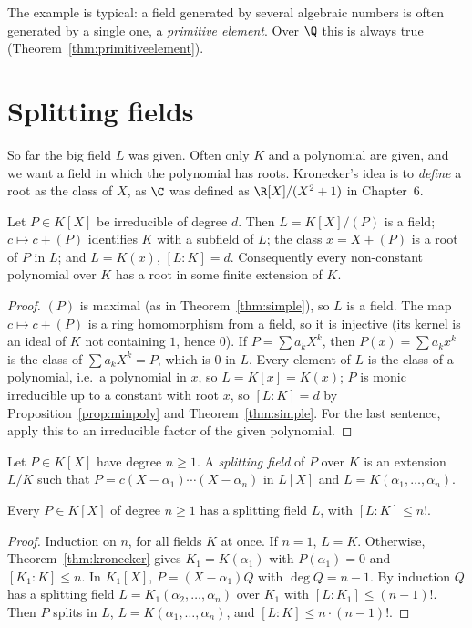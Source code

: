 The example is typical: a field generated by several algebraic numbers is often generated by a single one, a \emph{primitive element}. Over $\Q$ this is always true (Theorem~\ref{thm:primitiveelement}).

\section{Splitting fields}\label{sec:splitting}

So far the big field $L$ was given. Often only $K$ and a polynomial are given, and we want a field in which the polynomial has roots. Kronecker's idea is to \emph{define} a root as the class of $X$, as $\C$ was defined as $\R[X]/(X^2+1)$ in Chapter~6.

\begin{theorem}[Kronecker]\label{thm:kronecker}
Let $P\in K[X]$ be irreducible of degree $d$. Then $L=K[X]/(P)$ is a field; $c\mapsto c+(P)$ identifies $K$ with a subfield of $L$; the class $x=X+(P)$ is a root of $P$ in $L$; and $L=K(x)$, $[L:K]=d$. Consequently every non-constant polynomial over $K$ has a root in some finite extension of $K$.
\end{theorem}
\begin{proof}
$(P)$ is maximal (as in Theorem~\ref{thm:simple}), so $L$ is a field. The map $c\mapsto c+(P)$ is a ring homomorphism from a field, so it is injective (its kernel is an ideal of $K$ not containing $1$, hence $0$). If $P=\sum a_kX^k$, then $P(x)=\sum a_kx^k$ is the class of $\sum a_kX^k=P$, which is $0$ in $L$. Every element of $L$ is the class of a polynomial, i.e.\ a polynomial in $x$, so $L=K[x]=K(x)$; $P$ is monic irreducible up to a constant with root $x$, so $[L:K]=d$ by Proposition~\ref{prop:minpoly} and Theorem~\ref{thm:simple}. For the last sentence, apply this to an irreducible factor of the given polynomial.
\end{proof}

\begin{definition}
Let $P\in K[X]$ have degree $n\ge1$. A \emph{splitting field} of $P$ over $K$ is an extension $L/K$ such that $P=c(X-\alpha_1)\cdots(X-\alpha_n)$ in $L[X]$ and $L=K(\alpha_1,\dots,\alpha_n)$.
\end{definition}

\begin{proposition}\label{prop:splitexists}
Every $P\in K[X]$ of degree $n\ge1$ has a splitting field $L$, with $[L:K]\le n!$.
\end{proposition}
\begin{proof}
Induction on $n$, for all fields $K$ at once. If $n=1$, $L=K$. Otherwise, Theorem~\ref{thm:kronecker} gives $K_1=K(\alpha_1)$ with $P(\alpha_1)=0$ and $[K_1:K]\le n$. In $K_1[X]$, $P=(X-\alpha_1)Q$ with $\deg Q=n-1$. By induction $Q$ has a splitting field $L=K_1(\alpha_2,\dots,\alpha_n)$ over $K_1$ with $[L:K_1]\le(n-1)!$. Then $P$ splits in $L$, $L=K(\alpha_1,\dots,\alpha_n)$, and $[L:K]\le n\cdot(n-1)!$.
\end{proof}

